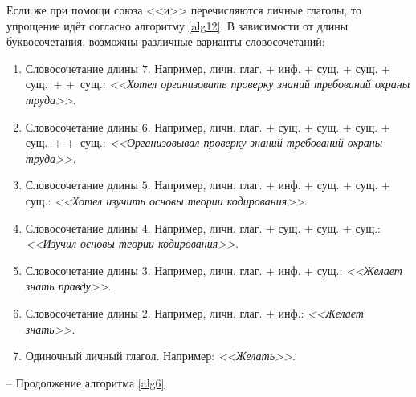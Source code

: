 \documentclass[main]{subfiles}
\begin{document}
Если же при помощи союза <<и>> перечисляются личные глаголы, то упрощение идёт согласно алгоритму \ref{alg12}. В зависимости от длины буквосочетания, возможны различные варианты словосочетаний:
\begin{enumerate}
	\item Словосочетание длины $7$. Например, личн. глаг. + инф. + сущ. + сущ. + сущ.~+ +~сущ.: \textit{<<Хотел организовать проверку знаний требований охраны труда>>}.
	\item Словосочетание длины $6$. Например, личн. глаг. + сущ. + сущ. + сущ. + сущ.~+ +~сущ.: \textit{<<Организовывал проверку знаний требований охраны труда>>}.
	\item Словосочетание длины $5$. Например, личн. глаг. + инф. + сущ. + сущ. + сущ.: \textit{<<Хотел изучить основы теории кодирования>>}.
	\item Словосочетание длины $4$. Например, личн. глаг. + сущ. + сущ. + сущ.: \textit{<<Изучил основы теории кодирования>>}.
	\item Словосочетание длины $3$. Например, личн. глаг. + инф. + сущ.: \textit{<<Желает знать правду>>}.
	\item Словосочетание длины $2$. Например, личн. глаг. + инф.: \textit{<<Желает знать>>}.
	\item Одиночный личный глагол. Например: \textit{<<Желать>>}.
\end{enumerate}
\begin{algorithm}
	\caption{-- Продолжение алгоритма \ref{alg6}}\label{alg12}
	\begin{algorithmic}[1]
		\EndIf
		\EndIf
	\end{algorithmic}
\end{algorithm}
\end{document}
